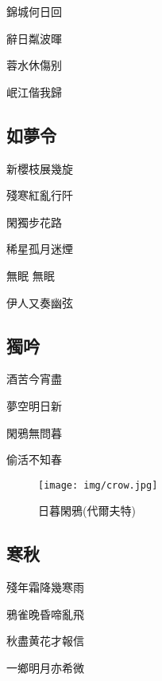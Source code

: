 \documentclass[a4j,12pt]{ltjtarticle}
\begin{document}
\begin{center}
	\vfill
		\LARGE 錦城何日回 \par
		辭日粼波暉 \par
		蓉水休傷别 \par
		岷江偕我歸
		\vspace{2cm} %
	\vfill
	
	\newpage
	
	\begin{flushleft}
		\section{如夢令} 
	\end{flushleft}	
	
	
	\vfill
		\LARGE 新櫻枝展幾旋 \par
		殘寒紅亂行阡 \par
		閑獨步花路 \par
		稀星孤月迷煙 \par
		無眠  無眠 \par
		伊人又奏幽弦
		\vspace{2cm} %
	\vfill
	
	
	\newpage
	
	\begin{flushleft}
		\section{獨吟} 
	\end{flushleft}	
	
	\vfill
		\LARGE 酒苦今宵盡 \par
		夢空明日新 \par
		閑鴉無問暮 \par
		偷活不知春 
		\vspace{2cm} %
	\vfill
	
	\newpage
	\vfill
	\begin{figure}[h!]
		\centering
		\texttt{[image: img/crow.jpg]}
		\caption{日暮閑鴉(代爾夫特)}
		\label{fig:crow}
	\end{figure}
	\vfill
	\newpage
	
	\begin{flushleft}
		\section{寒秋} 
	\end{flushleft}	
	
	\vfill
		\LARGE 殘年霜降幾寒雨 \par
		鴉雀晚昏啼亂飛 \par
		秋盡黄花才報信 \par
		一鄉明月亦希微 
		\vspace{2cm} %
	\vfill
	\newpage
	

\end{center}
\end{document}
